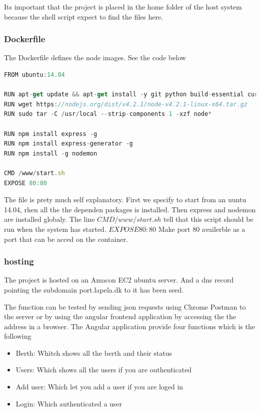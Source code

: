 \documentclass[a4paper,12pt,english]{article}
\begin{document}
Its important that the project is placed in the home folder of the host system because the shell script expect to find the files here.

\subsubsection{Dockerfile}
The Dockerfile defines the node images. See the code below

\begin{lstlisting}[language=javascript]
FROM ubuntu:14.04

RUN apt-get update && apt-get install -y git python build-essential curl nano wget libkrb5-dev
RUN wget https://nodejs.org/dist/v4.2.1/node-v4.2.1-linux-x64.tar.gz
RUN sudo tar -C /usr/local --strip-components 1 -xzf node*

RUN npm install express -g
RUN npm install express-generator -g
RUN npm install -g nodemon

CMD /www/start.sh
EXPOSE 80:80
\end{lstlisting}

The file is prety much self explanatory. First we specify to start from an uuntu 14.04, rhen all the the dependen packages is installed. Then express and nodemon are installed globaly.
The line $CMD /www/start.sh$ tell that this script should be run when the system has started.
$EXPOSE 80:80$ Make port 80 availerble as a port that can be acced on the container.
\subsubsection{hosting}
The project is hosted on an Amacon EC2 ubuntu server. And a dns record pointing the subdomain port.lapela.dk to it has been seed.

The function can be tested by sending json requests using Chrome Postman to the server or by using the angular frontend application by accessing the the address in a browser. The Angular application provide four functions which is the following
\begin{itemize}
\item Berth: Whitch shows all the berth and their status
\item Users: Which shows all the users if you are outhenticated
\item Add user: Which let you add a user if you are loged in
\item Login: Which authenticated a user
\end{itemize}
\end{document}
